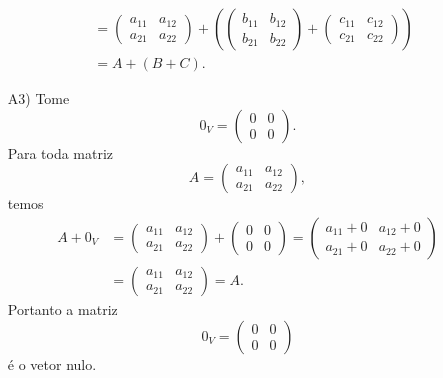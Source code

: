 \documentclass[12pt]{exam}
\begin{document}
\begin{itemize}
\begin{align*}
            \\ &= \begin{pmatrix} a_{11} & a_{12}\\a_{21} & a_{22}\end{pmatrix} +
            \left(\begin{pmatrix} b_{11} & b_{12}\\b_{21} & b_{22}\end{pmatrix} +
            \begin{pmatrix} c_{11} & c_{12}\\c_{21} & c_{22}\end{pmatrix}\right)
            \\ &= A + (B + C).
        \end{align*}

        \item[A3)] Tome
        \[
        0_V = \begin{pmatrix}0 & 0\\0 & 0\end{pmatrix}.
        \]
        Para toda matriz
        \[
        A = \begin{pmatrix} a_{11} & a_{12}\\a_{21} & a_{22}\end{pmatrix},
        \]
        temos
        \begin{align*}
            A + 0_V & = \begin{pmatrix} a_{11} & a_{12}\\a_{21} & a_{22}\end{pmatrix} +
            \begin{pmatrix}0 & 0\\0 & 0\end{pmatrix}
            = \begin{pmatrix}a_{11} + 0 & a_{12} + 0\\a_{21} + 0  & a_{22} + 0\end{pmatrix}
            \\ &= \begin{pmatrix} a_{11} & a_{12}\\a_{21} & a_{22}\end{pmatrix} = A.
        \end{align*}
        Portanto a matriz
        \[
        0_V = \begin{pmatrix}0 & 0\\0 & 0\end{pmatrix}
        \]
        é o vetor nulo.


\end{itemize}
\end{document}
